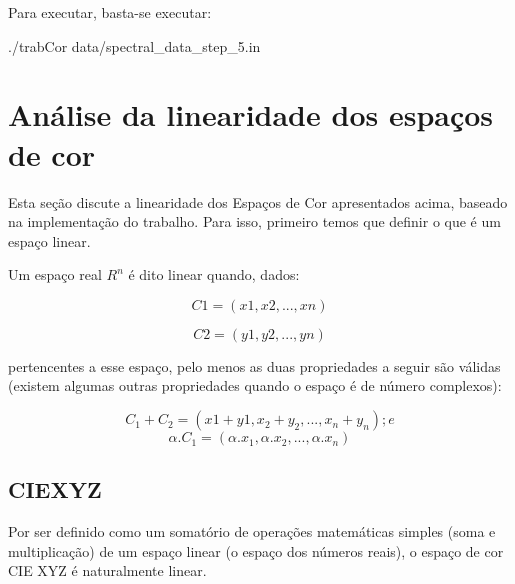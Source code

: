 \par
Para executar, basta-se executar:
\begin{list}{}{}
\item ./trabCor data/spectral_data_step_5.in
\end{list}



\section{Análise da linearidade dos espaços de cor}
\label{sec:analise_espacos_de_cor}
\par
Esta seção discute a linearidade dos Espaços de Cor apresentados acima, baseado
na implementação do trabalho. Para isso, primeiro temos que definir o que é um
espaço linear.

\par
Um espaço real $R^n$ é dito linear quando, dados:

\begin{equation}\label{eqC1}
C1=(x1,x2, ..., xn)
\end{equation}

\begin{equation}\label{eqC2}
C2=(y1, y2, ..., yn)
\end{equation}

\par
pertencentes a esse espaço, pelo menos as duas propriedades a seguir são válidas
(existem algumas outras propriedades quando o espaço é de número complexos):

\begin{equation}
C_1+C_2 = (x1+y1, x_2+y_2, ..., x_n+y_n); e
\end{equation}
\begin{equation}
\alpha.C_1 = (\alpha.x_1, \alpha.x_2, ..., \alpha.x_n)
\end{equation}

\subsection{CIEXYZ}
\par
Por ser definido como um somatório de operações matemáticas simples (soma e
multiplicação) de um espaço linear (o espaço dos números reais), o espaço de cor
CIE XYZ é naturalmente linear.

